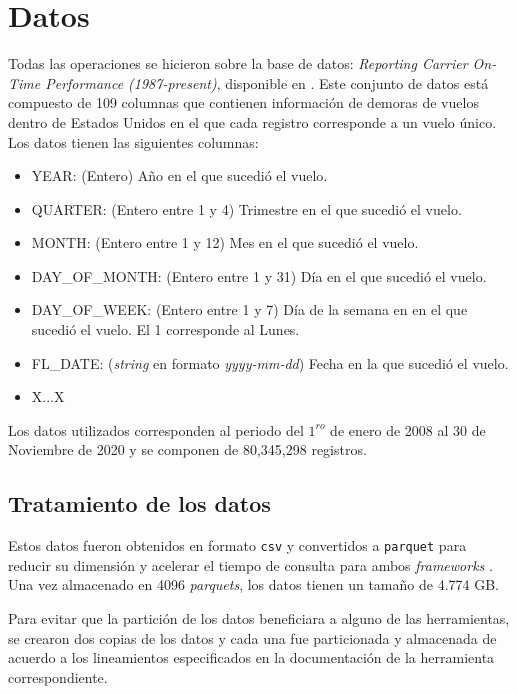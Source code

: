 \section{Datos}

Todas las operaciones se hicieron sobre la base de datos: 
\textit{Reporting Carrier On-Time Performance (1987-present)}, disponible en \cite{linktranstat}. Este conjunto de datos está compuesto de 109 columnas que contienen información de demoras de vuelos dentro de Estados Unidos en el que cada registro corresponde a un vuelo único. Los datos tienen las siguientes columnas:

\begin{itemize}
	\item YEAR: (Entero) Año en el que sucedió el vuelo.
	\item QUARTER: (Entero entre 1 y 4) Trimestre en el que sucedió el vuelo.
	\item MONTH: (Entero entre 1 y 12) Mes en el que sucedió el vuelo.
	\item DAY\_OF\_MONTH: (Entero entre 1 y 31) Día en el que sucedió el vuelo.
	\item DAY\_OF\_WEEK: (Entero entre 1 y 7) Día de la semana en en el que sucedió el vuelo. El 1 corresponde al Lunes.
	\item FL\_DATE: (\textit{string} en formato \textit{yyyy-mm-dd}) Fecha en la que sucedió el vuelo.
	\item \LARGE X...X
\end{itemize}

Los datos utilizados corresponden al periodo del $1^{ro}$ de enero de 2008 al 30 de Noviembre de 2020 y se componen de 80,345,298 registros. 

\subsection{Tratamiento de los datos}

Estos datos fueron obtenidos en formato \texttt{csv} y convertidos a \texttt{parquet} para reducir su dimensión y acelerar el tiempo de consulta para ambos \textit{frameworks} . Una vez almacenado en 4096 \textit{parquets}, los datos tienen un tamaño de 4.774 GB.

Para evitar que la partición de los datos beneficiara a alguno de las herramientas, se crearon dos copias de los datos y cada una fue particionada y almacenada de acuerdo a los lineamientos especificados en la documentación de la herramienta correspondiente.

